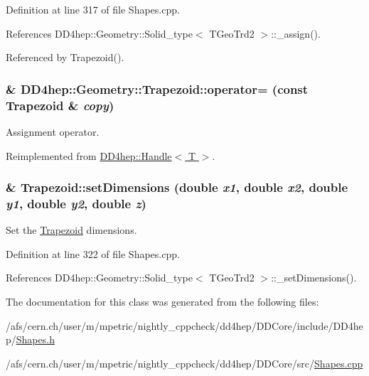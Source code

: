 Definition at line 317 of file Shapes.cpp.

References DD4hep::Geometry::Solid\_\-type$<$ TGeoTrd2 $>$::\_\-assign().

Referenced by Trapezoid().\hypertarget{class_d_d4hep_1_1_geometry_1_1_trapezoid_a9d413378312d775bce87cbacefed99e6}{
\subsubsection[{operator=}]{\& DD4hep::Geometry::Trapezoid::operator= (const {\bf Trapezoid} \& {\em copy})}}
\label{class_d_d4hep_1_1_geometry_1_1_trapezoid_a9d413378312d775bce87cbacefed99e6}


Assignment operator. 

Reimplemented from \hyperlink{class_d_d4hep_1_1_handle_a9bbf8f498df42e81ad26fb00233505a6}{DD4hep::Handle$<$ T $>$}.\hypertarget{class_d_d4hep_1_1_geometry_1_1_trapezoid_ad36a96cf7a7fbcd3145ca664e2c8fa39}{
\subsubsection[{setDimensions}]{ \& Trapezoid::setDimensions (double {\em x1}, \/  double {\em x2}, \/  double {\em y1}, \/  double {\em y2}, \/  double {\em z})}}
\label{class_d_d4hep_1_1_geometry_1_1_trapezoid_ad36a96cf7a7fbcd3145ca664e2c8fa39}


Set the \hyperlink{class_d_d4hep_1_1_geometry_1_1_trapezoid}{Trapezoid} dimensions. 

Definition at line 322 of file Shapes.cpp.

References DD4hep::Geometry::Solid\_\-type$<$ TGeoTrd2 $>$::\_\-setDimensions().

The documentation for this class was generated from the following files:\begin{DoxyCompactItemize}
\item 
/afs/cern.ch/user/m/mpetric/nightly\_\-cppcheck/dd4hep/DDCore/include/DD4hep/\hyperlink{_shapes_8h}{Shapes.h}\item 
/afs/cern.ch/user/m/mpetric/nightly\_\-cppcheck/dd4hep/DDCore/src/\hyperlink{_shapes_8cpp}{Shapes.cpp}\end{DoxyCompactItemize}
